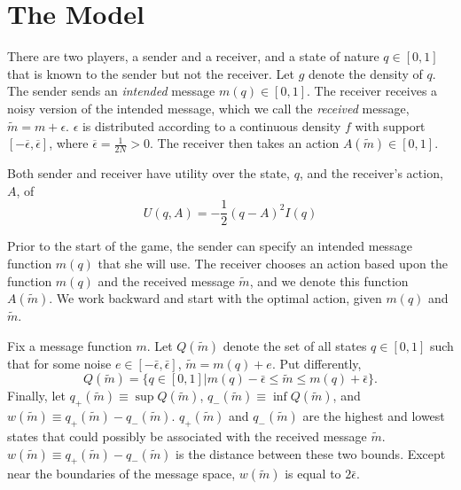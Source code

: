 \documentclass{article}
\begin{document}
\section{The Model}

There are two players, a sender and a receiver, and a state of nature $q\in [ 0,1]$ that is known to the sender but not the receiver. Let $g$ denote the density of $q$. The sender sends an \textit{intended} message $m(q)\in [ 0,1]$. The receiver receives a noisy version of the intended message, which we call the \textit{received} message, $\widetilde{m} =m+\epsilon $. $\epsilon $ is distributed according to a continuous density $ f$ with support $[-\overline{\epsilon },\overline{\epsilon }]$, where $\overline{\epsilon }=\frac{1}{2N}>0$. The receiver then takes an action $A( \widetilde{m})\in [ 0,1]$.

Both sender and receiver have utility over the state, $q$, and the receiver's action, $A$, of 
\begin{equation}
	U(q,A)=-\frac{1}{2}(q-A)^{2}I(q)
\end{equation}

Prior to the start of the game, the sender can specify an intended message function $m(q)$ that she will use. The receiver chooses an action based upon the function $m(q)$ and the received message $\widetilde{m}$, and we denote this function $A(\widetilde{m})$. We work backward and start with the optimal action, given $m(q)$ and $\widetilde{m}$.

Fix a message function $m$. Let $Q(\widetilde{m})$ denote the set of all states $q\in [ 0,1]$ such that for some noise $e\in [ -\bar{\epsilon},\bar{\epsilon}]$, $\widetilde{m}=m(q)+e$. Put differently, 
\begin{equation}
	Q(\widetilde{m})=\{q\in[0,1]|m(q)-\bar{\epsilon}\leq \widetilde{m}\leq m(q)+\bar{\epsilon}\}.
\end{equation}
Finally, let $q_{+}(\widetilde{m})\equiv \sup Q(\widetilde{m})$, $q_{-}(\widetilde{m})\equiv \inf Q(\widetilde{m})$, and $w(\widetilde{m})\equiv q_{+}(\widetilde{m})-q_{-}(\widetilde{m})$. $q_{+}(\widetilde{m})$ and $ q_{-}(\widetilde{m})$ are the highest and lowest states that could possibly be associated with the received message $\widetilde{m}$. $w(\widetilde{m})\equiv q_{+}(\widetilde{m})-q_{-}( \widetilde{m})$ is the distance between these two bounds. Except near the boundaries of the message space, $w(\widetilde{m})$ is equal to $2\bar{\epsilon}$.
\end{document}
